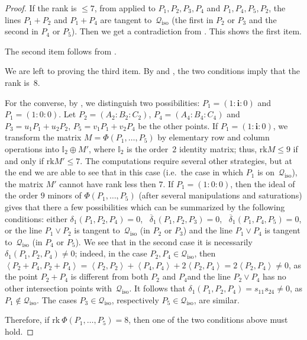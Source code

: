 \documentclass{amsart}
\theoremstyle{plain}
\theoremstyle{definition}
\newcommand{\iso}{\mathcal{Q}_{\mathrm{iso}}}
\newcommand{\scl}[2]{\left\langle {#1}, {#2} \right\rangle}
\newcommand{\iii}{\textbf{i}}
\newcommand{\rk}{\ensuremath{\mathrm{rk}}}
\begin{document}
\begin{proof}
If the rank is $\leq 7$, from
 applied to $P_1, P_2, P_3, P_4$ and $P_1, P_4, P_5, P_2$,
the lines $P_1+P_2$ and $P_1 + P_4$ are tangent to~$\iso$ (the first in $P_2$ or $P_3$ and the second in $P_4$ or $P_5$).
Then we get a contradiction from .
This shows the first item.

The second item follows from .

We are left to proving the third item. By  and , the two conditions imply that the rank is~$8$.  

For the converse, by , we distinguish two possibilities:
$P_1 = (1:\iii :0)$ and
$P_1 = (1: 0: 0)$.
Let $P_2 = (A_2: B_2: C_2)$, $P_4 = (A_4: B_4: C_4)$ and
$P_3 = u_1P_1+u_2P_2$, $P_5 = v_1P_1+v_2P_4$ be the other points.
If $P_1 = (1: \iii: 0)$, we transform the matrix $M = \Phi(P_1, \dots, P_5)$ by elementary row and column operations into $\mathbb{I}_2 \oplus M'$, where $\mathbb{I}_2$ is the order~$2$ identity matrix; thus, $\rk  M \leq 9$ if and only if $\rk  M' \leq 7$.
The computations require several other strategies, but at the end we are
able to see that in this case (i.e.\ the case in which $P_1$ is on~$\iso$), the matrix $M'$ cannot have rank less then $7$.
If $P_1 = (1: 0: 0)$, then the ideal of the order $9$ minors of
$\Phi(P_1, \dots, P_5)$ (after several manipulations and saturations)
gives that there a few possibilities which can be summarized by the
following conditions: either $\delta_1(P_1, P_2, P_4) = 0$,
\ $\overline{\delta}_1(P_1, P_2, P_3) = 0$,
\ $\overline{\delta}_1(P_1, P_4, P_5) = 0$, or the line $P_1 \vee P_2$ is tangent to~$\iso$ (in $P_2$ or $P_3$) and the line $P_1 \vee P_4$ is tangent to~$\iso$ (in $P_4$ or $P_5$). We see that in the second case it is necessarily $\delta_1(P_1,P_2,P_4)
\neq 0$; indeed, in the case $P_2, P_4 \in \iso$, then $\scl{P_2 +P_4}{P_2+P_4}= \scl{P_2}{P_2} + \scl{P_4}{P_4}+2\scl{P_2}{P_4} =2\scl{P_2}{P_4} \neq 0$, as 
the point $P_2 + P_4$ is different from both $P_2$ and $P_4$and the line $P_2 \vee P_4$ has no other intersection points with~$\iso$. It follows that 
$\delta_1 (P_1,P_2,P_4)=s_{11}s_{24} \neq 0$, as $P_1 \not\in \iso$. The cases $P_3 \in \iso$, respectively $P_5\in \iso$, are similar.

Therefore, if $\rk \ \Phi(P_1, \dots, P_5) = 8$, then one of the two conditions above must hold. 
\end{proof}
\end{document}

